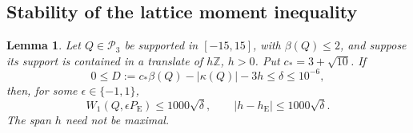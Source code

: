 \documentclass[aop]{imsart}
\theoremstyle{plain}
\newtheorem{lemma}[theorem]{Lemma}
\theoremstyle{definition}
\theoremstyle{definition}
\newcommand{\Pthree}{\mathcal P_3}
\newcommand{\Pe}{P_{\mathrm E}}
\begin{document}
\subsection{Stability of the lattice moment inequality}

\begin{lemma}\label{lem:effective-lattice-stability}
Let $Q\in\Pthree$ be supported in $[-15,15]$, with $\beta(Q)\le2$,
and suppose its support is contained in a translate of $h\mathbb Z$,
$h>0$.  Put $c_*=3+\sqrt{10}$.  If
\[
 0\le D:=c_*\beta(Q)-|\kappa(Q)|-3h\le\delta\le10^{-6},
\]
then, for some $\epsilon\in\{-1,1\}$,
\begin{equation}\label{eq:effective-lattice-stability}
 W_1(Q,\epsilon\Pe)\le1000\sqrt\delta,\qquad
 |h-h_{\mathrm E}|\le1000\sqrt\delta.
\end{equation}
The span $h$ need not be maximal.
\end{lemma}
\end{document}
